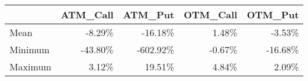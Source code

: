 \begin{tabular}{lrrrr}
\hline
         &   ATM\_Call &   ATM\_Put &   OTM\_Call &   OTM\_Put \\
\hline
 Mean    &     -8.29\% &   -16.18\% &      1.48\% &    -3.53\% \\
 Minimum &    -43.80\% &  -602.92\% &     -0.67\% &   -16.68\% \\
 Maximum &      3.12\% &    19.51\% &      4.84\% &     2.09\% \\
\hline
\end{tabular}
